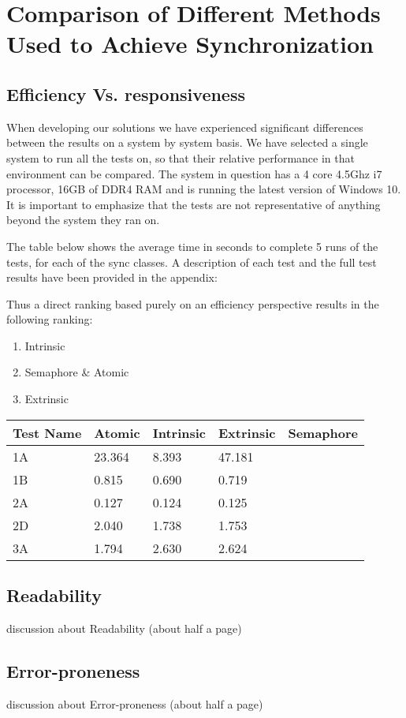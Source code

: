 \documentclass[11pt]{article}
\begin{document}
\maketitle
\tableofcontents
\thispagestyle{empty}
\pagebreak
\setcounter{page}{1}
\section{Comparison of Different Methods Used to Achieve Synchronization}

\subsection{Efficiency Vs. responsiveness}


When developing our solutions we have experienced significant differences between the results on a system by system basis. We have selected a single system to run all the tests on, so that their relative performance in that environment can be compared. The system in question has a 4 core 4.5Ghz i7 processor, 16GB of DDR4 RAM and is running the latest version of Windows 10. It is important to emphasize that the tests are not representative of anything beyond the system they ran on.

The table below shows the average time in seconds to complete 5 runs of the tests, for each of the sync classes. A description of each test and the full test results have been provided in the appendix: 

Thus a direct ranking based purely on an efficiency perspective results in the following ranking: 

\begin{enumerate}
	\item Intrinsic
	\item Semaphore \& Atomic
	\item Extrinsic
\end{enumerate}


\begin{table}[H]
\begin{tabular}{|l|l|l|l|l|}
\hline
Test Name & Atomic & Intrinsic & Extrinsic & Semaphore \\ \hline
1A        & 23.364 & 8.393     & 47.181    &           \\ \hline
1B        & 0.815  & 0.690     & 0.719     &           \\ \hline
2A        & 0.127  & 0.124     & 0.125     &           \\ \hline
2D        & 2.040  & 1.738     & 1.753     &           \\ \hline
3A        & 1.794  & 2.630     & 2.624     &           \\ \hline
\end{tabular}
\end{table}

\subsection{Readability}
discussion about  Readability (about half a page)
\subsection{Error-proneness}
discussion about Error-proneness (about half a page)




\end{document}
